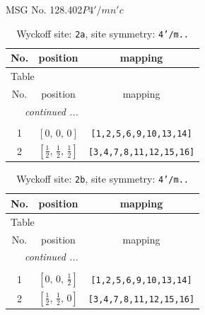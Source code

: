 \documentclass[fleqn,8pt]{jsarticle}
\begin{document}
\setcounter{MaxMatrixCols}{32}

\renewcommand{\tablename}{Table~}
\renewcommand{\figurename}{Figure~}
\begin{center}
\LARGE
MSG No. 128.402\quad$P4'/mn'c$
\end{center}
\renewcommand{\arraystretch}{1.2}
\begin{longtable}{ccc}
\caption{Wyckoff site: {\tt 2a}, site symmetry: {\tt 4'/m..}}
 \\
 \hline \hline
No. & position & mapping \\ \hline \endfirsthead

\multicolumn{2}{l}{\tablename\ \thetable{}} \\
 \hline \hline
No. & position & mapping \\ \hline \endhead

 \hline \hline
\multicolumn{2}{r}{\footnotesize\it continued ...} \\ \endfoot

 \hline \hline
\multicolumn{2}{r}{} \\ \endlastfoot

1 & $\left[ 0,\, 0,\, 0 \right]$ & {\tt [1,2,5,6,9,10,13,14]} \\ \hline
2 & $\left[ \frac{1}{2},\, \frac{1}{2},\, \frac{1}{2} \right]$ & {\tt [3,4,7,8,11,12,15,16]} \\
\end{longtable}
\renewcommand{\arraystretch}{1.2}
\begin{longtable}{ccc}
\caption{Wyckoff site: {\tt 2b}, site symmetry: {\tt 4'/m..}}
 \\
 \hline \hline
No. & position & mapping \\ \hline \endfirsthead

\multicolumn{2}{l}{\tablename\ \thetable{}} \\
 \hline \hline
No. & position & mapping \\ \hline \endhead

 \hline \hline
\multicolumn{2}{r}{\footnotesize\it continued ...} \\ \endfoot

 \hline \hline
\multicolumn{2}{r}{} \\ \endlastfoot

1 & $\left[ 0,\, 0,\, \frac{1}{2} \right]$ & {\tt [1,2,5,6,9,10,13,14]} \\ \hline
2 & $\left[ \frac{1}{2},\, \frac{1}{2},\, 0 \right]$ & {\tt [3,4,7,8,11,12,15,16]} \\
\end{longtable}
\end{document}
